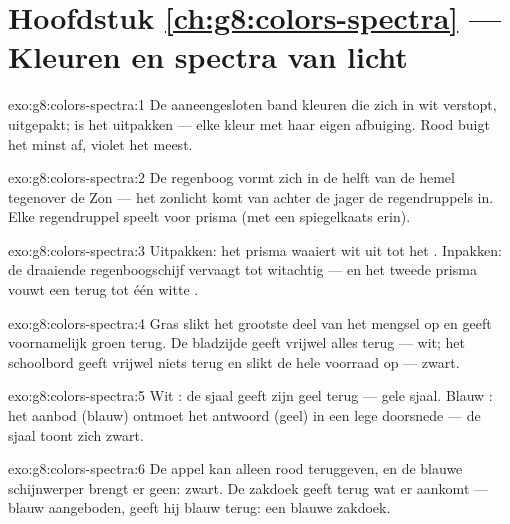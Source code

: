 \section*{Hoofdstuk \ref{ch:g8:colors-spectra} --- Kleuren en spectra van licht}

\begin{solution}{exo:g8:colors-spectra:1}
De aaneengesloten band kleuren die zich in wit  verstopt,
uitgepakt;  is het uitpakken --- elke kleur met haar
eigen afbuiging. Rood buigt het minst af, violet het meest.
\end{solution}

\begin{solution}{exo:g8:colors-spectra:2}
De regenboog vormt zich in de helft van de hemel tegenover de Zon ---
het zonlicht komt van achter de jager de regendruppels in. Elke
regendruppel speelt voor prisma (met een spiegelkaats erin).
\end{solution}

\begin{solution}{exo:g8:colors-spectra:3}
Uitpakken: het prisma waaiert wit  uit tot het
. Inpakken: de draaiende regenboogschijf vervaagt tot
witachtig --- en het tweede prisma vouwt een  terug tot
één witte .
\end{solution}

\begin{solution}{exo:g8:colors-spectra:4}
Gras slikt het grootste deel van het mengsel op en geeft voornamelijk
groen terug. De bladzijde geeft vrijwel alles terug --- wit; het
schoolbord geeft vrijwel niets terug en slikt de hele voorraad op ---
zwart.
\end{solution}

\begin{solution}{exo:g8:colors-spectra:5}
Wit : de sjaal geeft zijn geel terug --- gele sjaal. Blauw
: het aanbod (blauw) ontmoet het antwoord (geel) in een lege
doorsnede --- de sjaal toont zich zwart.
\end{solution}

\begin{solution}{exo:g8:colors-spectra:6}
De appel kan alleen rood teruggeven, en de blauwe schijnwerper brengt
er geen: zwart. De zakdoek geeft terug wat er aankomt --- blauw
aangeboden, geeft hij blauw terug: een blauwe zakdoek.
\end{solution}

